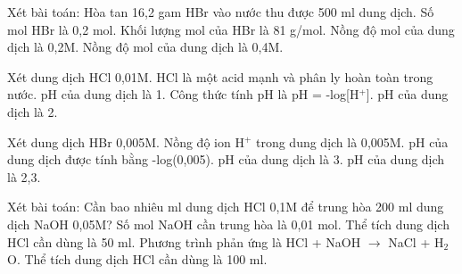\documentclass[Main.tex]{subfiles}
\begin{document}
    \begin{ex}
    Xét bài toán: Hòa tan 16{,}2 gam HBr vào nước thu được 500 ml dung dịch.
    \choiceTF
    {\True Số mol HBr là 0{,}2 mol.}
    {\True Khối lượng mol của HBr là 81 g/mol.}
    {Nồng độ mol của dung dịch là 0{,}2M.}
    {\True Nồng độ mol của dung dịch là 0{,}4M.}
    \end{ex}
    
    \begin{ex}
    Xét dung dịch HCl 0{,}01M.
    \choiceTF
    {\True HCl là một acid mạnh và phân ly hoàn toàn trong nước.}
    {pH của dung dịch là 1.}
    {\True Công thức tính pH là pH = -log[H$^+$].}
    {\True pH của dung dịch là 2.}
    \end{ex}
    
    \begin{ex}
    Xét dung dịch HBr 0{,}005M.
    \choiceTF
    {\True Nồng độ ion H$^+$ trong dung dịch là 0{,}005M.}
    {\True pH của dung dịch được tính bằng -log(0{,}005).}
    {pH của dung dịch là 3.}
    {\True pH của dung dịch là 2{,}3.}
    \end{ex}
    
    \begin{ex}
    Xét bài toán: Cần bao nhiêu ml dung dịch HCl 0{,}1M để trung hòa 200 ml dung dịch NaOH 0{,}05M?
    \choiceTF
    {\True Số mol NaOH cần trung hòa là 0{,}01 mol.}
    {Thể tích dung dịch HCl cần dùng là 50 ml.}
    {\True Phương trình phản ứng là HCl + NaOH $\rightarrow$ NaCl + H$_2$O.}
    {\True Thể tích dung dịch HCl cần dùng là 100 ml.}
    \end{ex}
    
\end{document}
